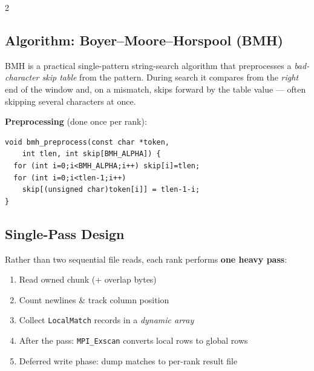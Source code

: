 \documentclass[11pt,a4paper]{article}
\begin{document}
\begin{multicols}{2}
\subsection{Algorithm: Boyer--Moore--Horspool (BMH)}

BMH is a practical single-pattern string-search algorithm that preprocesses a \textit{bad-character skip table} from the pattern.
During search it compares from the \emph{right} end of the window and, on a mismatch, skips forward by the table value — often skipping several characters at once.

\begin{center}
\end{center}

\textbf{Preprocessing} (done once per rank):
\begin{lstlisting}[style=cstyle]
void bmh_preprocess(const char *token,
    int tlen, int skip[BMH_ALPHA]) {
  for (int i=0;i<BMH_ALPHA;i++) skip[i]=tlen;
  for (int i=0;i<tlen-1;i++)
    skip[(unsigned char)token[i]] = tlen-1-i;
}
\end{lstlisting}

\columnbreak

\subsection{Single-Pass Design}

Rather than two sequential file reads, each rank performs \textbf{one heavy pass}:

\begin{enumerate}[leftmargin=*,nosep,label=\textcolor{primary}{\arabic*.}]
  \item Read owned chunk (+ overlap bytes)
  \item Count newlines \& track column position
  \item Collect \texttt{LocalMatch} records in a \textit{dynamic array}
  \item After the pass: \texttt{MPI\_Exscan} converts local rows to global rows
  \item Deferred write phase: dump matches to per-rank result file
\end{enumerate}


\end{multicols}
\end{document}
